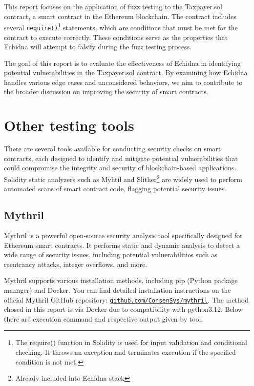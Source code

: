 \documentclass{article}
\begin{document}
This report focuses on the application of fuzz testing to 
the Taxpayer.sol contract, a smart contract in the Ethereum blockchain. 
The contract includes several \texttt{require()}\footnote{The require() function in Solidity is used for input validation and conditional checking. It throws an exception and terminates execution if the specified condition is not met.} statements, which are 
conditions that must be met for the contract to execute correctly. 
These conditions serve as the properties that Echidna will attempt to 
falsify during the fuzz testing process.

The goal of this report is to evaluate the effectiveness of Echidna 
in identifying potential vulnerabilities in the Taxpayer.sol contract. 
By examining how Echidna handles various edge cases and unconsidered 
behaviors, we aim to contribute to the broader discussion on improving 
the security of smart contracts.

\section{Other testing tools}
There are several tools available for conducting security checks on smart contracts, each designed to identify and mitigate potential vulnerabilities that could compromise the integrity and security of blockchain-based applications. Solidity static analyzers such as Myhtil and Slither\footnote{Already included into Echidna stack} are widely used to perform automated scans of smart contract code, flagging potential security issues. 
\subsection{Mythril}
Mythril is a powerful open-source security analysis tool specifically designed for Ethereum smart contracts. It performs static and dynamic analysis to detect a wide range of security issues, including potential vulnerabilities such as reentrancy attacks, integer overflows, and more.

Mythril supports various installation methods, including pip (Python package manager) and Docker. 
You can find detailed installation instructions on the official Mythril 
GitHub repository: \texttt{\href{https://github.com/ConsenSys/mythril}{github.com/ConsenSys/mythril}}. 
The method chosed in this report is via Docker due to compatibility with python3.12. 
Below there are execution command and respective output given by tool.
\end{document}

